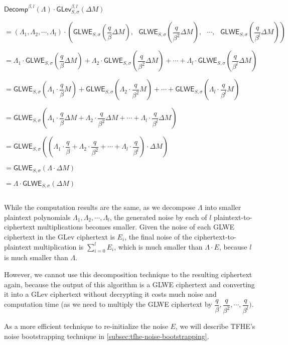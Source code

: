 $\textsf{Decomp}^{\beta, l}(\Lambda) \cdot \textsf{GLev}_{S, \sigma}^{\beta, l}(\Delta M)$

$= (\Lambda_1, \Lambda_2, \cdots, \Lambda_l) \cdot \left (\textsf{GLWE}_{S, \sigma}\left(\dfrac{q}{\beta} \Delta M\right), \text{ } \textsf{GLWE}_{S, \sigma}\left(\dfrac{q}{\beta^2} \Delta M\right), \text{ } \cdots, \text{ } \textsf{GLWE}_{S, \sigma}\left(\dfrac{q}{\beta^l} \Delta M\right) \right )$

$= \Lambda_1\cdot\textsf{GLWE}_{S, \sigma}\left(\dfrac{q}{\beta} \Delta M\right) +  \Lambda_2\cdot\textsf{GLWE}_{S, \sigma}\left(\dfrac{q}{\beta^2} \Delta M\right) + \cdots + \Lambda_l\cdot\textsf{GLWE}_{S, \sigma}\left(\dfrac{q}{\beta^l} \Delta M\right)$

$= \textsf{GLWE}_{S, \sigma}\left(\Lambda_1\cdot\dfrac{q}{\beta} M\right) +\textsf{GLWE}_{S, \sigma}\left(\Lambda_2\cdot\dfrac{q}{\beta^2} M\right)+ \cdots + \textsf{GLWE}_{S, \sigma}\left(\Lambda_l\cdot\dfrac{q}{\beta^l} M\right)$

$= \textsf{GLWE}_{S, \sigma}\left(\Lambda_1\cdot\dfrac{q}{\beta} \Delta M + \Lambda_2\cdot\dfrac{q}{\beta^2} \Delta M + \cdots + \Lambda_l\cdot\dfrac{q}{\beta^l} \Delta M\right)$

$= \textsf{GLWE}_{S, \sigma}\left(\left(\Lambda_1\cdot\dfrac{q}{\beta} + \Lambda_2\cdot\dfrac{q}{\beta^2} + \cdots + \Lambda_l\cdot\dfrac{q}{\beta^l}\right)\cdot \Delta M\right)$

$= \textsf{GLWE}_{S, \sigma}\left(\Lambda \cdot \Delta M\right)$

$= \Lambda \cdot \textsf{GLWE}_{S, \sigma}( \Delta M)$

$ $

While the computation results are the same, as we decompose $\Lambda$ into smaller plaintext polynomials $\Lambda_1, \Lambda_2, \cdots, \Lambda_l$, the generated noise by each of $l$ plaintext-to-ciphertext multiplications becomes smaller.  Given the noise of each GLWE ciphertext in the GLev ciphertext is $E_i$, the final noise of the ciphertext-to-plaintext multiplication is $\sum\limits_{i=0}^{l}E_i$, which is much smaller than $\Lambda \cdot E$, because $l$ is much smaller than $\Lambda$. 

However, we cannot use this decomposition technique to the resulting ciphertext again, because the output of this algorithm is a GLWE ciphertext and converting it into a GLev ciphertext without decrypting it costs much noise and computation time (as we need to multiply the GLWE ciphertext by $\dfrac{q}{\beta}, \dfrac{q}{\beta^2}, \cdots, \dfrac{q}{\beta^l})$.  

As a more efficient technique to re-initialize the noise $E$, we will describe TFHE's noise bootstrapping technique in \autoref{subsec:tfhe-noise-bootstrapping}.
